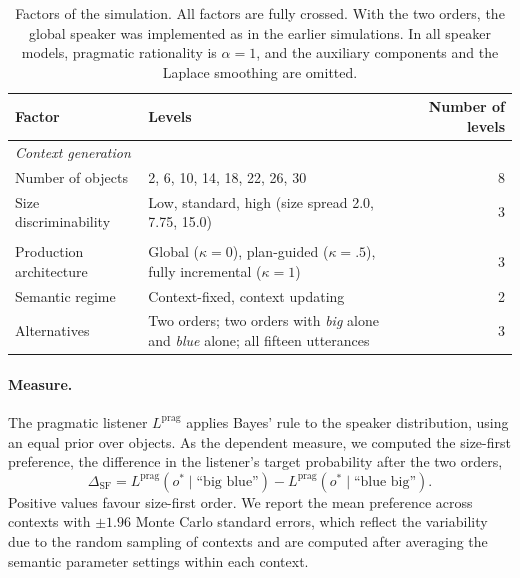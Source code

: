 \documentclass[10pt,a4paper,fleqn]{article}
\begin{document}
\begin{table}[!htbp]
\centering
\caption{Factors of the simulation. All factors are fully crossed. With the two orders, the global speaker was implemented as in the earlier simulations. In all speaker models, pragmatic rationality is $\alpha=1$, and the auxiliary components and the Laplace smoothing are omitted.}
\label{tab:simulation-design}
\footnotesize
\begin{tabularx}{0.92\textwidth}{lXr}
\toprule
Factor & Levels & Number of levels \\
\midrule
\multicolumn{3}{l}{\emph{Context generation}} \\
\quad Number of objects & 2, 6, 10, 14, 18, 22, 26, 30 & 8 \\
\quad Size discriminability & Low, standard, high (size spread 2.0, 7.75, 15.0) & 3 \\
\addlinespace
\multicolumn{3}{l}{\emph{Speaker models}} \\
\quad Production architecture & Global ($\kappa=0$), plan-guided ($\kappa=.5$), fully incremental ($\kappa=1$) & 3 \\
\quad Semantic regime & Context-fixed, context updating & 2 \\
\quad Alternatives & Two orders; two orders with \emph{big} alone and \emph{blue} alone; all fifteen utterances & 3 \\
\bottomrule
\end{tabularx}
\end{table}

\paragraph{Measure.}
The pragmatic listener $L^{\mathrm{prag}}$ applies Bayes' rule to the speaker distribution, using an equal prior over objects.
As the dependent measure, we computed the size-first preference, the difference in the listener's target probability after the two orders,
\begin{equation}
  \Delta_{\mathrm{SF}}
  =L^{\mathrm{prag}}(o^*\mid\text{``big blue''})
  -L^{\mathrm{prag}}(o^*\mid\text{``blue big''}).
  \label{eq:simulation-advantage}
\end{equation}
Positive values favour size-first order.
We report the mean preference across contexts with $\pm1.96$ Monte Carlo standard errors, which reflect the variability due to the random sampling of contexts and are computed after averaging the semantic parameter settings within each context.
\end{document}
